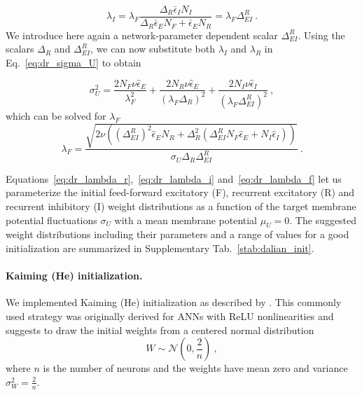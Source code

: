 \documentclass[11pt,a4paper]{article}
\begin{document}
\begin{equation}
    \lambda_I = \lambda_F \frac{ \Delta_R \bar\epsilon_I N_I }{\Delta_R \bar\epsilon_E N_F + \bar\epsilon_E N_R} = \lambda_F\Delta_{EI}^R  ~.
    \label{eq:dr_lambda_i}
\end{equation}
We introduce here again a network-parameter dependent scalar $\Delta_{EI}^R$. Using the scalars  $\Delta_R$ and $\Delta_{EI}^R$, we can now substitute both $\lambda_I$ and $\lambda_R$ in Eq.~\eqref{eq:dr_sigma_U} to obtain

\begin{equation}
\sigma^2_{U} = \frac{2 N_{F}\nu\hat\epsilon_{E}}{\lambda_F^2} + \frac{2 N_{R}\nu\hat\epsilon_{E}}{\left(\lambda_F\Delta_R\right)^2} + \frac{2 N_{I}\nu\hat\epsilon_{I}}{\left(\lambda_F\Delta_{EI}^R\right)^2}  ~,
\end{equation}
which can be solved for $\lambda_F$
\begin{equation}
    \lambda_F = \frac{ \sqrt{2 \nu \left((\Delta_{EI}^{R})^2 \hat\epsilon_E N_R + \Delta_R^2\left(\Delta_{EI}^R N_F \hat\epsilon_E + N_I \hat\epsilon_I \right) \right)} }{ \sigma_U \Delta_{R} \Delta_{EI}^R}~.
    \label{eq:dr_lambda_f}
\end{equation}

Equations~\eqref{eq:dr_lambda_r},~\eqref{eq:dr_lambda_i} and~\eqref{eq:dr_lambda_f} let us parameterize the initial feed-forward excitatory (F), recurrent excitatory (R) and recurrent inhibitory (I) weight distributions as a function of the target membrane potential fluctuations $\sigma_U$ with a mean membrane potential $\mu_U = 0$. The suggested weight distributions including their parameters and a range of values for a good initialization are summarized in Supplementary Tab.~\ref{stab:dalian_init}. 

\paragraph{Kaiming (He) initialization.}
We implemented Kaiming (He) initialization as described by \citet{He2015-kv}. 
This commonly used strategy was originally derived for \acp{ANN} with ReLU nonlinearities and 
suggests to draw the initial weights from a centered normal distribution
\begin{equation}
     W \sim \mathcal{N}\left(0, \frac{2}{n}\right)~,
\end{equation}
where $n$ is the number of neurons and the weights have mean zero and variance
$\sigma_W^2 = \frac{2}{n}$.
\end{document}
